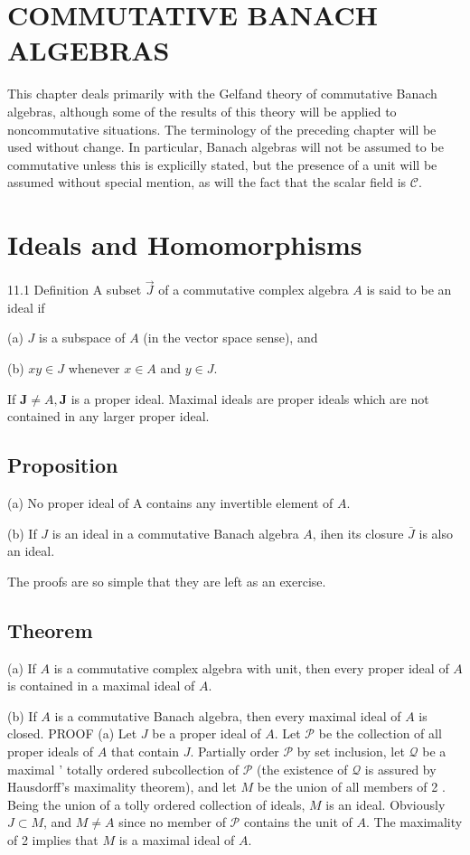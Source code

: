 \documentclass[10pt]{article}
\begin{document}
\section{COMMUTATIVE BANACH ALGEBRAS}
This chapter deals primarily with the Gelfand theory of commutative Banach algebras, although some of the results of this theory will be applied to noncommutative situations. The terminology of the preceding chapter will be used without change. In particular, Banach algebras will not be assumed to be commutative unless this is explicilly stated, but the presence of a unit will be assumed without special mention, as will the fact that the scalar field is $\mathscr{C}$.

\section{Ideals and Homomorphisms}
11.1 Definition A subset $\vec{J}$ of a commutative complex algebra $A$ is said to be an ideal if

(a) $J$ is a subspace of $A$ (in the vector space sense), and

(b) $x y \in J$ whenever $x \in A$ and $y \in J$.

If $\boldsymbol{J} \neq A, \boldsymbol{J}$ is a proper ideal. Maximal ideals are proper ideals which are not contained in any larger proper ideal.

\subsection{Proposition}
(a) No proper ideal of A contains any invertible element of $A$.

(b) If $J$ is an ideal in a commutative Banach algebra $A$, ihen its closure $\bar{J}$ is also an ideal.

The proofs are so simple that they are left as an exercise.

\subsection{Theorem}
(a) If $A$ is a commutative complex algebra with unit, then every proper ideal of $A$ is contained in a maximal ideal of $A$.

(b) If $A$ is a commutative Banach algebra, then every maximal ideal of $A$ is closed. PROOF (a) Let $J$ be a proper ideal of $A$. Let $\mathscr{P}$ be the collection of all proper ideals of $A$ that contain $J$. Partially order $\mathscr{P}$ by set inclusion, let $\mathscr{Q}$ be a maximal ' totally ordered subcollection of $\mathscr{P}$ (the existence of $\mathscr{Q}$ is assured by Hausdorff's maximality theorem), and let $M$ be the union of all members of 2 . Being the union of a tolly ordered collection of ideals, $M$ is an ideal. Obviously $J \subset M$, and $M \neq A$ since no member of $\mathscr{P}$ contains the unit of $A$. The maximality of 2 implies that $M$ is a maximal ideal of $A$.
\end{document}
